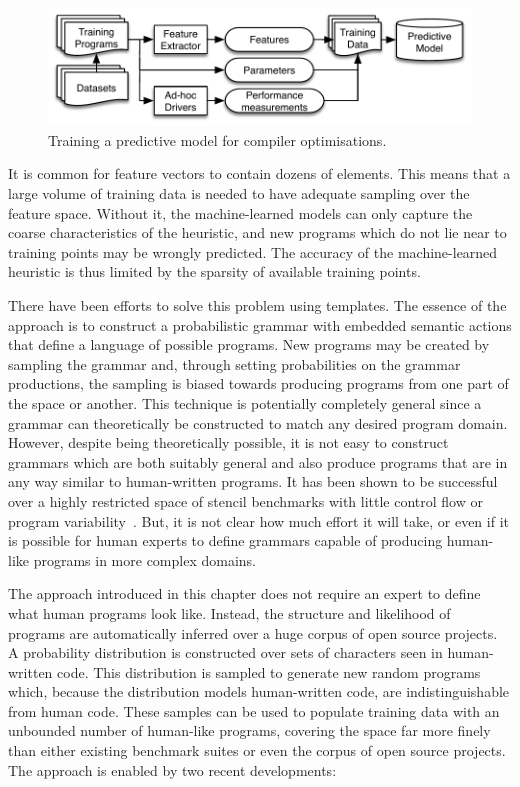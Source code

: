 \begin{figure}
  \includegraphics[width=\columnwidth]{img/overview-a}%
  \caption[Training a predictive model for compiler optimisations]{Training a predictive model for compiler optimisations.}%
  \label{fig:training-a-predictive-model}
\end{figure}

It is common for feature vectors to contain dozens of elements. This means that a large volume of training data is needed to have adequate sampling over the feature space. Without it, the machine-learned models can only capture the coarse characteristics of the heuristic, and new programs which do not lie near to training points may be wrongly predicted. The accuracy of the machine-learned heuristic is thus limited by the sparsity of available training points.

There have been efforts to solve this problem using templates. The essence of the approach is to construct a probabilistic grammar with embedded semantic actions that define a language of possible programs. New programs may be created by sampling the grammar and, through setting probabilities on the grammar productions, the sampling is biased towards producing programs from one part of the space or another. This technique is potentially completely general since a grammar can theoretically be constructed to match any desired program domain. However, despite being theoretically possible, it is not easy to construct grammars which are both suitably general and also produce programs that are in any way similar to human-written programs. It has been shown to be successful over a highly restricted space of stencil benchmarks with little control flow or program variability~\cite{Falch2015,Cummins2016a}. But, it is not clear how much effort it will take, or even if it is possible for human experts to define grammars capable of producing human-like programs in more complex domains.

The approach introduced in this chapter does not require an expert to define what human programs look like. Instead, the structure and likelihood of programs are automatically inferred over a huge corpus of open source projects. A probability distribution is constructed over sets of characters seen in human-written code. This distribution is sampled to generate new random programs which, because the distribution models human-written code, are indistinguishable from human code. These samples can be used to populate training data with an unbounded number of human-like programs, covering the space far more finely than either existing benchmark suites or even the corpus of open source projects. The approach is enabled by two recent developments:


